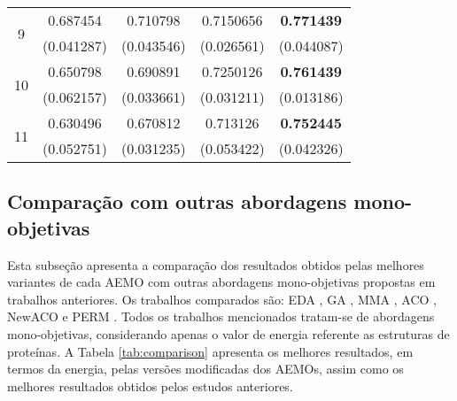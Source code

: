 \begin{table}[]
\begin{tabular}{|c|c|c|c|c|}
		
			\multirow{2}{*}{9}      & 0.687454          & 0.710798          & 0.7150656                & \cellcolor[HTML]{C0C0C0}\textbf{0.771439}       \\
			& (0.041287)        & (0.043546)        & (0.026561)               & \cellcolor[HTML]{C0C0C0}(0.044087)              \\ \hline
			  
		  
		  \multirow{2}{*}{10}      & 0.650798          & 0.690891         & 0.7250126                & \cellcolor[HTML]{C0C0C0}\textbf{0.761439}       \\
		  & (0.062157)        & (0.033661)        & (0.031211)               & \cellcolor[HTML]{C0C0C0}(0.013186)              \\ \hline
		  
		  
		  
		   
		   \multirow{2}{*}{11}      & 0.630496          & 0.670812         & 0.713126                & \cellcolor[HTML]{C0C0C0}\textbf{0.752445}       \\
		   & (0.052751)        & (0.031235)        & (0.053422)               & \cellcolor[HTML]{C0C0C0}(0.042326)              \\ \hline
	\end{tabular}
\end{table}


\subsection{Comparação com outras abordagens mono-objetivas}
Esta subseção apresenta a comparação dos resultados obtidos pelas melhores variantes de cada AEMO com outras abordagens mono-objetivas propostas em trabalhos anteriores. Os trabalhos comparados são: EDA \cite{santana2008protein}, GA \cite{unger1993genetic}, MMA \cite{krasnogor2002multimeme}, ACO \cite{shmygelska2002ant},  NewACO \cite{ shmygelska2003improved} e PERM \cite{hsu2003growth}. Todos os trabalhos mencionados tratam-se de abordagens mono-objetivas, considerando apenas o valor de energia referente as estruturas de proteínas. A Tabela \ref{tab:comparison} apresenta os melhores resultados, em termos da energia, pelas versões modificadas dos AEMOs, assim como os melhores resultados obtidos pelos estudos anteriores.




